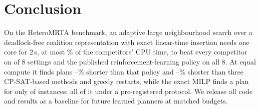\section{Conclusion}
\label{sec:conclusion}

On the HeteroMRTA benchmark, an adaptive large neighbourhood search over a deadlock-free coalition representation
with exact linear-time insertion needs one core for 2\,s, at most \ShareTwohi\% of the competitors' CPU time, to beat
every competitor on \Ctwoheld{} of 8 settings and the published reinforcement-learning policy on all 8. At equal
compute it finds plans \ConeBrlgainlo--\ConeBrlgainhi\% shorter than that policy and
\ConeBclasslo--\ConeBclasshi\% shorter than three CP-SAT-based methods and greedy restarts, while the exact MILP finds
a plan for only \CtasSolved{} of \CtasRuns{} instances; all of it under a pre-registered protocol. We release all code and results as a baseline for future learned planners at matched budgets.
